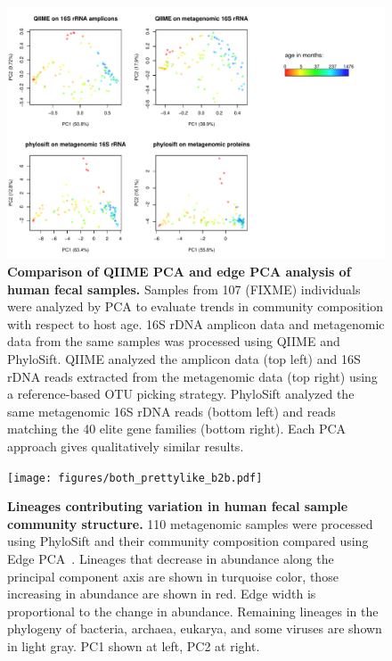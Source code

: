 \documentclass[10pt]{article}
\begin{document}
\begin{figure}[hp]
\begin{center}
\includegraphics[width=6in]{figures/allofem.pdf}
\end{center}
\caption{\textbf{Comparison of QIIME PCA and edge PCA analysis of human fecal samples.} Samples from 107 (FIXME) individuals were analyzed by PCA to evaluate trends in community composition with respect to host age. 16S rDNA amplicon data and metagenomic data from the same samples was processed using QIIME and PhyloSift. QIIME analyzed the amplicon data (top left) and 16S rDNA reads extracted from the metagenomic data (top right) using a reference-based OTU picking strategy. PhyloSift analyzed the same metagenomic 16S rDNA reads (bottom left) and reads matching the 40 elite gene families (bottom right). Each PCA approach gives qualitatively similar results.}
\label{fig:agepca}
\end{figure}

\begin{figure}[hp]
\begin{center}
\texttt{[image: figures/both\_prettylike\_b2b.pdf]}
\end{center}
\caption{\textbf{Lineages contributing variation in human fecal sample community structure.} 110 metagenomic samples were processed using PhyloSift and their community composition compared using Edge PCA~\cite{Matsen2012}. Lineages that decrease in abundance along the principal component axis are shown in turquoise color, those increasing in abundance are shown in red. Edge width is proportional to the change in abundance. Remaining lineages in the phylogeny of bacteria, archaea, eukarya, and some viruses are shown in light gray. PC1 shown at left, PC2 at right.}
\label{fig:pcaphylo}
\end{figure}
\end{document}
